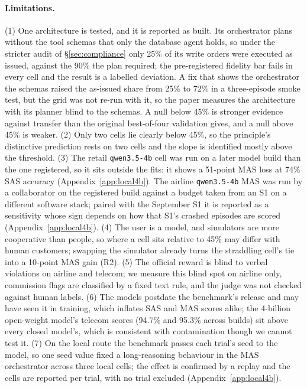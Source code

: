 \paragraph{Limitations.} (1) One architecture is tested, and it is reported as built. Its orchestrator plans without the tool schemas that only the database agent holds, so under the stricter audit of \S\ref{sec:compliance} only 25\% of its write orders were executed as issued, against the 90\% the plan required; the pre-registered fidelity bar fails in every cell and the result is a labelled deviation. A fix that shows the orchestrator the schemas raised the as-issued share from 25\% to 72\% in a three-episode smoke test, but the grid was not re-run with it, so the paper measures the architecture with its planner blind to the schemas. A null below 45\% is stronger evidence against transfer than the original best-of-four validation gives, and a null above 45\% is weaker. (2) Only two cells lie clearly below 45\%, so the principle's distinctive prediction rests on two cells and the slope is identified mostly above the threshold. (3) The retail \texttt{qwen3.5-4b} cell was run on a later model build than the one registered, so it sits outside the fits; it shows a 51-point MAS loss at 74\% SAS accuracy (Appendix~\ref{app:local4b}). The airline \texttt{qwen3.5-4b} MAS was run by a collaborator on the registered build against a budget taken from an S1 on a different software stack; paired with the September S1 it is reported as a sensitivity whose sign depends on how that S1's crashed episodes are scored (Appendix~\ref{app:local4b}). (4) The user is a model, and simulators are more cooperative than people, so where a cell sits relative to 45\% may differ with human customers; swapping the simulator already turns the straddling cell's tie into a 10-point MAS gain (R2). (5) The official reward is blind to verbal violations on airline and telecom; we measure this blind spot on airline only, commission flags are classified by a fixed text rule, and the judge was not checked against human labels. (6) The models postdate the benchmark's release and may have seen it in training, which inflates SAS and MAS scores alike; the 4-billion open-weight model's telecom scores (94.7\% and 95.3\% across builds) sit above every closed model's, which is consistent with contamination though we cannot test it. (7) On the local route the benchmark passes each trial's seed to the model, so one seed value fixed a long-reasoning behaviour in the MAS orchestrator across three local cells; the effect is confirmed by a replay and the cells are reported per trial, with no trial excluded (Appendix~\ref{app:local4b}).


